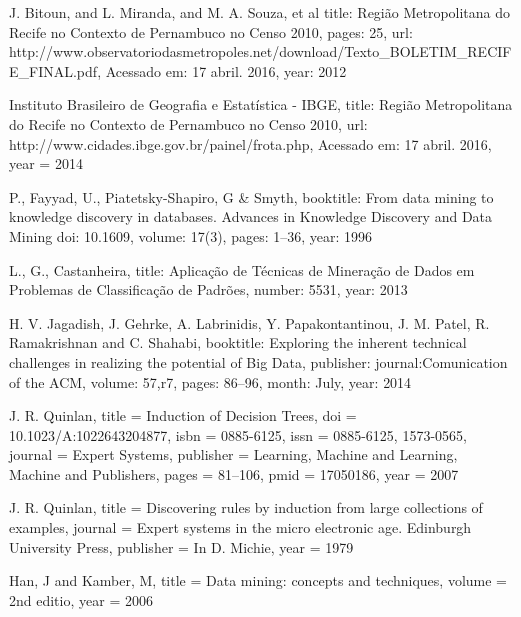 \documentclass[conference,compsoc]{IEEEtran}
\begin{document}
\begin{thebibliography}{1}

  J. Bitoun, and L. Miranda, and M. A. Souza, et al
  title: {Regi\~{a}o Metropolitana do Recife no Contexto de Pernambuco no Censo 2010},
  pages: {25},
  url:   {http://www.observatoriodasmetropoles.net/download/Texto\_BOLETIM\_RECIFE\_FINAL.pdf},
  Acessado em: {17 abril. 2016},
  year:  {2012}

  
  Instituto Brasileiro de Geografia e Estatística - IBGE,
  title: {Região Metropolitana do Recife no Contexto de Pernambuco no Censo 2010},
  url:  {http://www.cidades.ibge.gov.br/painel/frota.php},
  Acessado em: {17 abril. 2016},
  year = {2014}



  P., Fayyad, U., Piatetsky-Shapiro, G \& Smyth,
  booktitle: {From data mining to knowledge discovery in databases. Advances in Knowledge Discovery and Data Mining}
  doi: {10.1609},
  volume: {17(3)},
  pages: {1–36},
  year: {1996}

  L., G., Castanheira,
  title: {Aplicação de Técnicas de Mineração de Dados em Problemas de Classificação de Padrões},
  number: {5531},
  year: {2013}
  
  
  H. V. Jagadish, J. Gehrke, A. Labrinidis, Y. Papakontantinou, J. M. Patel, R. Ramakrishnan and C. Shahabi,
  booktitle: {Exploring the inherent technical challenges in realizing the potential of Big Data},
  publisher: {journal:Comunication of the ACM}, 
  volume: {57,r7}, 
  pages: {86--96}, 
  month: {July}, 
  year: {2014}

  
  J. R. Quinlan,
  title = {Induction of Decision Trees},
  doi = {10.1023/A:1022643204877},
  isbn = {0885-6125},
  issn = {0885-6125, 1573-0565},
  journal = {Expert Systems},
  publisher = {Learning, Machine and Learning, Machine and Publishers},
  pages = {81--106},
  pmid = {17050186},
  year = {2007}


  J. R. Quinlan,
  title = {Discovering rules by induction from large collections of examples},
  journal = {Expert systems in the micro electronic age. Edinburgh University Press},
  publisher = {In D. Michie},
  year = {1979}

  
  Han, J and Kamber, M,
  title = {Data mining: concepts and techniques},
  volume = {2nd editio},
  year = {2006}


\end{thebibliography}
\end{document}
